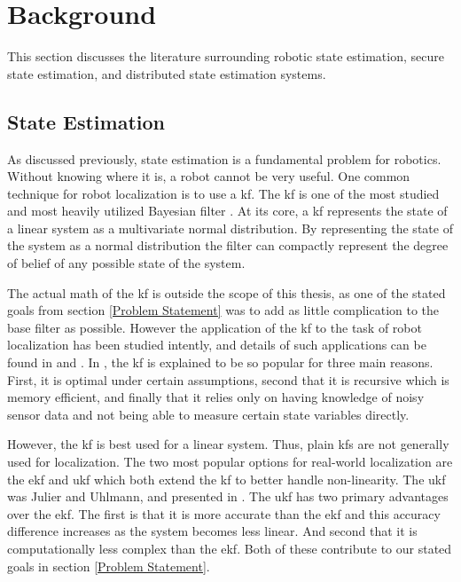 \documentclass[thesis.tex]{subfile}
\begin{document}
\chapter{Background} \label{Background}
This section discusses the literature surrounding robotic state estimation, secure state estimation, and distributed state estimation systems.

\section{State Estimation}
As discussed previously, state estimation is a fundamental problem for robotics. Without knowing where it is, a robot cannot be very useful. One common technique for robot localization is to use a \gls{kf}. The \gls{kf} is one of the most studied and most heavily utilized Bayesian filter \cite{ThrunGaussianFilters}. At its core, a \gls{kf} represents the state of a linear system as a multivariate normal distribution. By representing the state of the system as a normal distribution the filter can compactly represent the degree of belief of any possible state of the system.

The actual math of the \gls{kf} is outside the scope of this thesis, as one of the stated goals from section \ref{Problem Statement} was to add as little complication to the base filter as possible. However the application of the \gls{kf} to the task of robot localization has been studied intently, and details of such applications can be found in \cite{Localization2003} and \cite{Mohsin2014}. In \cite{Mohsin2014}, the \gls{kf} is explained to be so popular for three main reasons. First, it is optimal under certain assumptions, second that it is recursive which is memory efficient, and finally that it relies only on having knowledge of noisy sensor data and not being able to measure certain state variables directly.

However, the \gls{kf} is best used for a linear system. Thus, plain \glspl{kf} are not generally used for localization. The two most popular options for real-world localization are the \gls{ekf} and \gls{ukf} which both extend the \gls{kf} to better handle non-linearity. The \gls{ukf} was Julier and Uhlmann, and presented in \cite{Julier1997}. The \gls{ukf} has two primary advantages over the \gls{ekf}. The first is that it is more accurate than the \gls{ekf} and this accuracy difference increases as the system becomes less linear. And second that it is computationally less complex than the \gls{ekf}. Both of these contribute to our stated goals in section \ref{Problem Statement}.
\end{document}
